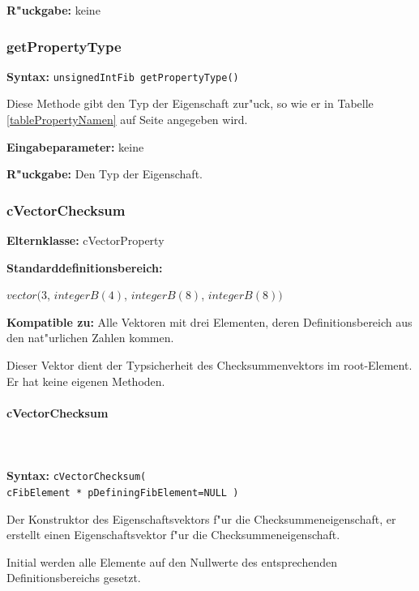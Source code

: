 \bigskip\noindent
\textbf{R"uckgabe:} keine


\subsubsection{getPropertyType}

\textbf{Syntax:} \verb|unsignedIntFib getPropertyType()|

\bigskip\noindent
Diese Methode gibt den Typ der Eigenschaft zur"uck, so wie er in Tabelle \ref{tablePropertyNamen} auf Seite \pageref{tablePropertyNamen} angegeben wird.

\bigskip\noindent
\textbf{Eingabeparameter:} keine

\bigskip\noindent
\textbf{R"uckgabe:} Den Typ der Eigenschaft.


\subsubsection{cVectorChecksum}

\bigskip\noindent
\textbf{Elternklasse:} cVectorProperty

\bigskip\noindent
\textbf{Standarddefinitionsbereich:}

$vector( 3$, $integerB(4)$,  $integerB(8)$, $integerB(8) )$

\bigskip\noindent
\textbf{Kompatible zu:} Alle Vektoren mit drei Elementen, deren Definitionsbereich aus den nat"urlichen Zahlen kommen.

\bigskip\noindent
Dieser Vektor dient der Typsicherheit des Checksummenvektors im root-Element. Er hat keine eigenen Methoden.


\paragraph{cVectorChecksum}

\ \\\\\noindent
\textbf{Syntax:} \verb|cVectorChecksum(| \\\verb|cFibElement * pDefiningFibElement=NULL )|

\bigskip\noindent
Der Konstruktor des Eigenschaftsvektors f"ur die Checksummeneigenschaft, er erstellt einen Eigenschaftsvektor f"ur die Checksummeneigenschaft.

Initial werden alle Elemente auf den Nullwerte des entsprechenden Definitionsbereichs gesetzt.

